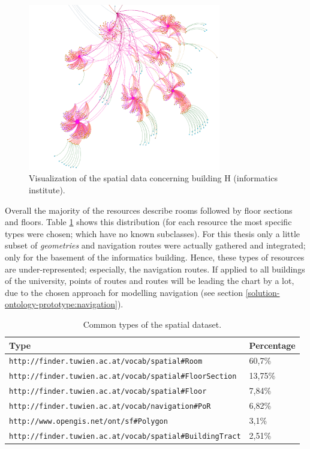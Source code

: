 \documentclass[draft,final]{vutinfth} %
\begin{document}
\begin{figure}[h]
    \centering
    \includegraphics[width=0.75\textwidth]{graphics/evaluation/spatialDatasetBuildingHSnippet.png}
    \caption{Visualization of the spatial data concerning building H (informatics institute).}
    \label{fig:dicussion-chapter-evaluation:dataset}
\end{figure}

Overall the majority of the resources describe rooms followed by floor sections and floors. Table \ref{tab:dicussion-chapter-evaluation:dataset} shows this distribution (for each resource the most specific types were chosen; which have no known subclasses). For this thesis only a little subset of \textit{geometries} and navigation routes were actually gathered and integrated; only for the basement of the informatics building. Hence, these types of resources are under-represented; especially, the navigation routes. If applied to  all buildings of the university, points of routes and routes will be leading the chart by a lot, due to the chosen approach for modelling navigation (see section \ref{solution-ontology-prototype:navigation}).

\begin{table}
  \centering
  \begin{tabular}{| l | l |}
    \hline
       Type & Percentage \\ \hline
       \texttt{http://finder.tuwien.ac.at/vocab/spatial\#Room} & 60,7\% \\ \hline
       \texttt{http://finder.tuwien.ac.at/vocab/spatial\#FloorSection} & 13,75\% \\ \hline
       \texttt{http://finder.tuwien.ac.at/vocab/spatial\#Floor} & 7,84\% \\ \hline
       \texttt{http://finder.tuwien.ac.at/vocab/navigation\#PoR} & 6,82\% \\ \hline
       \texttt{http://www.opengis.net/ont/sf\#Polygon} & 3,1\% \\ \hline
       \texttt{http://finder.tuwien.ac.at/vocab/spatial\#BuildingTract} & 2,51\% \\ \hline
  \end{tabular}
  \caption{Common types of the spatial dataset.}
  \label{tab:dicussion-chapter-evaluation:dataset}
\end{table}
\end{document}
